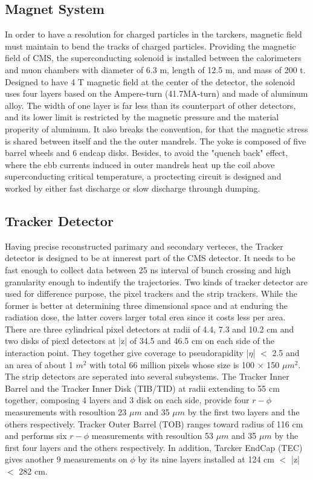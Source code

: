 \subsection{Magnet System} 
In order to have a resolution for charged particles in the tarckers, magnetic field must maintain to bend the tracks of charged particles. 
Providing the magnetic field of CMS, the superconducting solenoid is installed between the calorimeters and muon chambers with diameter of 6.3 m, length of 12.5 m, and mass of 200 t. 
Designed to have 4 T magnetic field at the center of the detector, the solenoid uses four layers based on the Ampere-turn (41.7MA-turn) and made of aluminum alloy.
The width of one layer is far less than its counterpart of other detectors, and its lower limit is restricted by the magnetic pressure and the material properity of aluminum.
It also breaks the convention, for that the magnetic stress is shared between itself and the the outer mandrels. 
The yoke is composed of five barrel wheels and 6 endcap disks. 
Besides, to avoid the "quench back" effect, where the ebb currents induced in outer mandrels heat up the coil above superconducting critical temperature, 
a proctecting circuit is designed and worked by either fast discharge or slow discharge throungh dumping. 

\subsection{Tracker Detector} 
Having precise reconstructed parimary and secondary verteces, the Tracker detector is designed to be at innerest part of the CMS detector.
It needs to be fast enough to collect data between 25 ns interval of bunch crossing and high granularity enough to indentify the trajectories. 
Two kinds of tracker detector are used for difference purpose, the pixel trackers and the strip trackers. 
While the former is better at determining three dimensional space and at enduring the radiation dose, 
the latter covers larger total erea since it costs less per area. 
There are three cylindrical pixel detectors at radii of 4.4, 7.3 and 10.2 cm and two disks of piexl detectors at |z| of 34.5 and 46.5 cm on each side of the interaction point. 
They together give coverage to pseudorapidity |$\eta $| $<$ 2.5 and an area of about 1 $m^2$ with total 66 million pixels whose size is 100 $\times$ 150 $\mu m^2$. 
The strip detectors are seperated into several subsystems. The Tracker Inner Barrel and the Tracker Inner Disk (TIB/TID) at radii extending to 55 cm together, composing 4 layers and 3 disk on each side, 
provide four $r-\phi $ measurements with resoultion 23 $\mu m$ and 35 $\mu m$ by the first two layers and the others respectively. 
Tracker Outer Barrel (TOB) ranges toward radius of 116 cm and performs six $r-\phi $ measurements with resoultion 53 $\mu m$ and 35 $\mu m$ by the first four layers and the others respectively.
In addition, Tarcker EndCap (TEC) gives another 9 measurements on $\phi $ by its nine layers installed at 124 cm $<$ |z| $<$ 282 cm.
 
